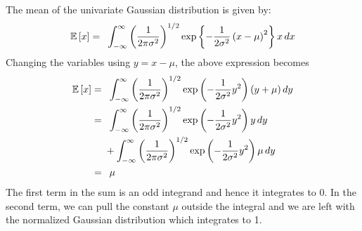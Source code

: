 The mean of the univariate Gaussian distribution is given by: 
\begin{align}
\operatorname{\mathbb{E}}\left[x\right] &= \,\,\,\int_{-\infty}^{\infty} \left(\frac{1}{2\pi\sigma^2}\right)^{1/2}\exp\left\lbrace-\frac{1}{2\sigma^2}\left(x-\mu\right)^2\right\rbrace x\,dx\\
\end{align}  
Changing the variables using $y = x - \mu$, the above expression becomes
\begin{align}
\operatorname{\mathbb{E}}\left[x\right] &= \,\,\,\int_{-\infty}^{\infty} \left(\frac{1}{2\pi\sigma^2}\right)^{1/2}\exp\left(-\frac{1}{2\sigma^2}y^2\right)\left(y+\mu\right)dy\\
&=\,\,\,\int_{-\infty}^{\infty} \left(\frac{1}{2\pi\sigma^2}\right)^{1/2}\exp\left(-\frac{1}{2\sigma^2}y^2\right)y\,dy \notag\\\ &\,\,\,\,\,\,\,\,+ \int_{-\infty}^{\infty} \left(\frac{1}{2\pi\sigma^2}\right)^{1/2}\exp\left(-\frac{1}{2\sigma^2}y^2\right)\mu\,dy\\
&= \,\,\,\mu
\end{align}
The first term in the sum is an odd integrand and hence it integrates to 0. In the second term, we can pull the constant $\mu$ outside the integral and we are left with the normalized Gaussian distribution which integrates to 1.